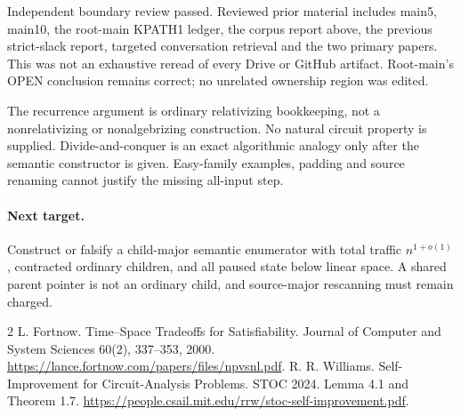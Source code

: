 \documentclass[11pt]{article}
\begin{document}
Independent boundary review passed. Reviewed prior material includes
main5, main10, the root-main KPATH1 ledger, the corpus report above,
the previous strict-slack report, targeted conversation retrieval and
the two primary papers. This was not an exhaustive reread of every Drive
or GitHub artifact. Root-main's OPEN conclusion remains correct; no
unrelated ownership region was edited.

The recurrence argument is ordinary relativizing bookkeeping, not a
nonrelativizing or nonalgebrizing construction. No natural circuit
property is supplied. Divide-and-conquer is an exact algorithmic analogy
only after the semantic constructor is given. Easy-family examples,
padding and source renaming cannot justify the missing all-input step.

\paragraph{Next target.}
Construct or falsify a child-major semantic enumerator with total traffic
$n^{1+o(1)}$, contracted ordinary children, and all paused state below
linear space. A shared parent pointer is not an ordinary child, and
source-major rescanning must remain charged.
\begin{thebibliography}{2}
 L. Fortnow. Time--Space Tradeoffs for Satisfiability.
Journal of Computer and System Sciences 60(2), 337--353, 2000.
\url{https://lance.fortnow.com/papers/files/npvsnl.pdf}.
 R. R. Williams. Self-Improvement for Circuit-Analysis
Problems. STOC 2024. Lemma 4.1 and Theorem 1.7.
\url{https://people.csail.mit.edu/rrw/stoc-self-improvement.pdf}.
\end{thebibliography}
\end{document}
